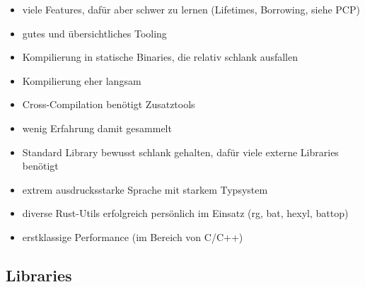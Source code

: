 \begin{itemize}
    \item viele Features, dafür aber schwer zu lernen (Lifetimes, Borrowing, siehe PCP)
    \item gutes und übersichtliches Tooling
    \item Kompilierung in statische Binaries, die relativ schlank ausfallen
    \item Kompilierung eher langsam
    \item Cross-Compilation benötigt Zusatztools
    \item wenig Erfahrung damit gesammelt
    \item Standard Library bewusst schlank gehalten, dafür viele externe Libraries benötigt
    \item extrem ausdrucksstarke Sprache mit starkem Typsystem
    \item diverse Rust-Utils erfolgreich persönlich im Einsatz (rg, bat, hexyl, battop)
    \item erstklassige Performance (im Bereich von C/C++)
\end{itemize}

\subsection{Libraries}
